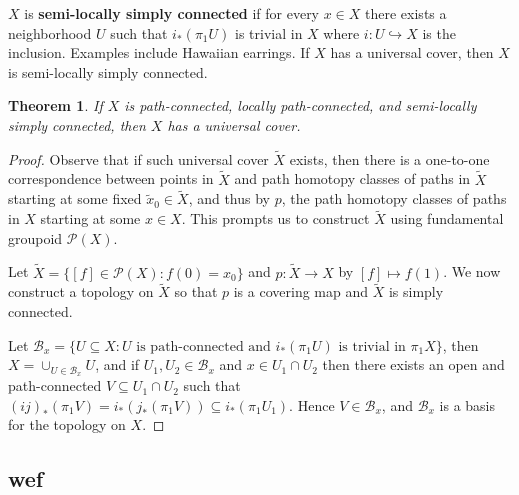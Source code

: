 \documentclass[11pt]{article}
\theoremstyle{definition}
\theoremstyle{plain}
\newtheorem{theorem}{Theorem}
\theoremstyle{remark}
\begin{document}
$X$ is \textbf{semi-locally simply connected} if for every $x\in X$ there exists a neighborhood $U$ such that $i_\ast(\pi_1U)$ is trivial in $X$ where $i:U\hookrightarrow X$ is the inclusion. Examples include Hawaiian earrings. If $X$ has a universal cover, then $X$ is semi-locally simply connected.

\begin{theorem}
If $X$ is path-connected, locally path-connected, and semi-locally simply connected, then $X$ has a universal cover.
\end{theorem}
\begin{proof}
Observe that if such universal cover $\widetilde{X}$ exists, then there is a one-to-one correspondence between points in $\widetilde{X}$ and path homotopy classes of paths in $\widetilde{X}$ starting at some fixed $\widetilde{x}_0\in\widetilde{X}$, and thus by $p$, the path homotopy classes of paths in $X$ starting at some $x\in X$. This prompts us to construct $\widetilde{X}$ using fundamental groupoid $\mathcal{P}(X)$.\medbreak

Let $\widetilde{X}=\{[f]\in\mathcal{P}(X):f(0)=x_0\}$ and $p:\widetilde{X}\to X$ by $[f]\mapsto f(1)$. We now construct a topology on $\widetilde{X}$ so that $p$ is a covering map and $\widetilde{X}$ is simply connected.\medbreak

Let $\mathcal{B}_x=\{U\subseteq X:U\textrm{ is path-connected and }i_\ast(\pi_1U)\textrm{ is trivial in }\pi_1X\}$, then $X=\cup_{U\in\mathcal{B}_x}U$, and if $U_1,U_2\in\mathcal{B}_x$ and $x\in U_1\cap U_2$ then there exists an open and path-connected $V\subseteq U_1\cap U_2$ such that $(ij)_\ast(\pi_1V)=i_\ast(j_\ast(\pi_1V))\subseteq i_\ast(\pi_1U_1)$. Hence $V\in\mathcal{B}_x$, and $\mathcal{B}_x$ is a basis for the topology on $X$.
\end{proof}

\subsection*{wef}
\end{document}
